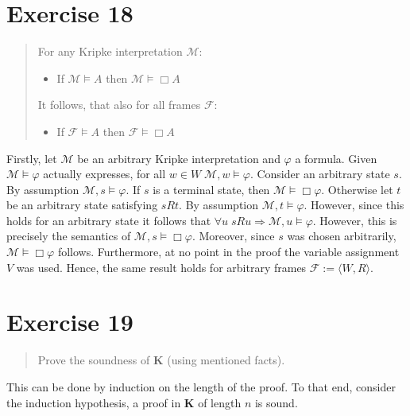 \documentclass[11pt,a4paper]{article}
\newcommand{\all}{\Box}
\newcommand{\sto}{\Rightarrow}
\begin{document}
\section*{Exercise 18}
\begin{quote}
For any Kripke interpretation $\mathcal{M}$:
\begin{itemize}
\item If $\mathcal{M} \models A$ then $\mathcal{M} \models \all A$
\end{itemize}
It follows, that also for all frames $\mathcal{F}$:
\begin{itemize}
\item If $\mathcal{F} \models A$ then $\mathcal{F} \models \all A$
\end{itemize}
\end{quote}

Firstly, let $\mathcal{M}$ be an arbitrary Kripke interpretation and $\varphi$ a formula. Given $\mathcal{M} \models \varphi$ actually expresses, for all $w \in W \; \mathcal{M},w \models \varphi$. Consider an arbitrary state $s$. By assumption $\mathcal{M},s \models \varphi$. If $s$ is a terminal state, then $\mathcal{M} \models \all \varphi$. Otherwise let $t$ be an arbitrary state satisfying $sRt$.
By assumption $\mathcal{M},t \models \varphi$. However, since this holds for an arbitrary state it follows that $\forall u \; sRu \sto \mathcal{M}, u \models \varphi$. However, this is precisely the semantics of $\mathcal{M}, s \models \all \varphi$. Moreover, since $s$ was chosen arbitrarily, $\mathcal{M}\models \all \varphi$ follows. Furthermore, at no point in the proof the variable assignment $V$ was used. Hence, the same result holds for arbitrary frames $\mathcal{F}:=\langle W,R \rangle$.

\section*{Exercise 19}
\begin{quote}
Prove the soundness of $\mathbf{K}$ (using mentioned facts).
\end{quote}

This can be done by induction on the length of the proof. To that end, consider the induction hypothesis, a proof in $\mathbf{K}$ of length $n$ is sound.
\end{document}
